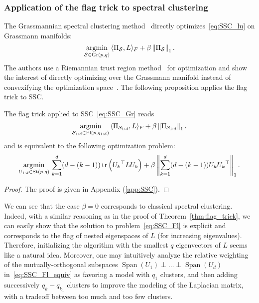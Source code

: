\subsubsection{Application of the flag trick to spectral clustering}
The Grassmannian spectral clustering method~\citep{wang_grassmannian_2017} directly optimizes~\eqref{eq:SSC_lu} on Grassmann manifolds:
\begin{equation}\label{eq:SSC_Gr}
	\underset{\mathcal{S} \in \operatorname{Gr}(p, q)}{\operatorname{argmin}} \, \langle \Pi_{\mathcal{S}}, L\rangle_F + \beta \left\lVert\Pi_{\mathcal{S}} \right\rVert_1.
\end{equation}
The authors use a Riemannian trust region method~\citep{absil_optimization_2009} for optimization and show the interest of directly optimizing over the Grassmann manifold instead of convexifying the optimization space~\citep{lu_convex_2016}.
The following proposition applies the flag trick to SSC.
\begin{proposition}\label{prop:SSC}
The flag trick applied to SSC~\eqref{eq:SSC_Gr} reads
\begin{equation}\label{eq:SSC_Fl}
	\underset{\mathcal{S}_{1:d} \in \operatorname{Fl}(p, q_{1:d})}{\operatorname{argmin}} \, \langle \Pi_{\mathcal{S}_{1:d}}, L\rangle_F + \beta \left\lVert\Pi_{\mathcal{S}_{1:d}} \right\rVert_1.
\end{equation}
and is equivalent to the following optimization problem:
\begin{equation}\label{eq:SSC_Fl_equiv}
	\underset{U_{1:d} \in \operatorname{St}(p, q)}{\operatorname{argmin}} \, \sum_{k=1}^d (d - (k-1)) \operatorname{tr}\left({U_k}^\top L U_k\right) + \beta \left\lVert\sum_{k=1}^d (d - (k-1)) U_k {U_k}^\top\right\rVert_1.
\end{equation}
\end{proposition}
\begin{proof}
The proof is given in Appendix (\autoref{app:SSC}).
\end{proof}
We can see that the case $\beta=0$ corresponds to classical spectral clustering. Indeed, with a similar reasoning as in the proof of Theorem~\ref{thm:flag_trick}, we can easily show that the solution to problem~\eqref{eq:SSC_Fl} is explicit and corresponds to the flag of nested eigenspaces of $L$ (for increasing eigenvalues). Therefore, initializing the algorithm with the smallest $q$ eigenvectors of $L$ seems like a natural idea.
Moreover, one may intuitively analyze the relative weighting of the mutually-orthogonal subspaces $\operatorname{Span}(U_1)\perp\dots\perp\operatorname{Span}(U_d)$ in~\eqref{eq:SSC_Fl_equiv} as favoring a model with $q_1$ clusters, and then adding successively $q_{k} - q_{k_1}$ clusters to improve the modeling of the Laplacian matrix, with a tradeoff between too much and too few clusters.


